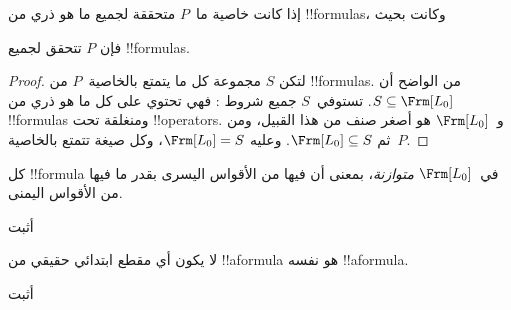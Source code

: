 \documentclass[../../../include/open-logic-section]{subfiles}
\begin{document}


\begin{thm}
  إذا كانت خاصية ما~$P$ متحققة لجميع ما هو ذري من !!{formula}s، وكانت
  بحيث
  \begin{enumerate}
  \end{enumerate}
  فإن $P$ تتحقق لجميع !!{formula}s.
\end{thm}

\begin{proof}
  لتكن $S$ مجموعة كل ما يتمتع بالخاصية~$P$ من !!{formula}s. من الواضح
  أن $S \subseteq \Frm[L_0]$. تستوفي~$S$ جميع شروط
  : فهي تحتوي على كل ما هو ذري من
  !!{formula}s ومنغلقة تحت !!{operator}s. و~$\Frm[L_0]$ هو
  أصغر صنف من هذا القبيل، ومن ثم $\Frm[L_0] \subseteq S$. وعليه
  $\Frm[L_0] = S$، وكل صيغة تتمتع بالخاصية~$P$.
\end{proof}

\begin{prop}
   كل !!{formula} في~$\Frm[L_0]$ \emph{متوازنة}، بمعنى أن فيها من
   الأقواس اليسرى بقدر ما فيها من الأقواس اليمنى.
\end{prop}

\begin{prob}
أثبت 
\end{prob}

\begin{prop} 
لا يكون أي مقطع ابتدائي حقيقي من !!a{formula} هو نفسه !!a{formula}.
\end{prop}

\begin{prob}
  أثبت 
\end{prob}
\end{document}
